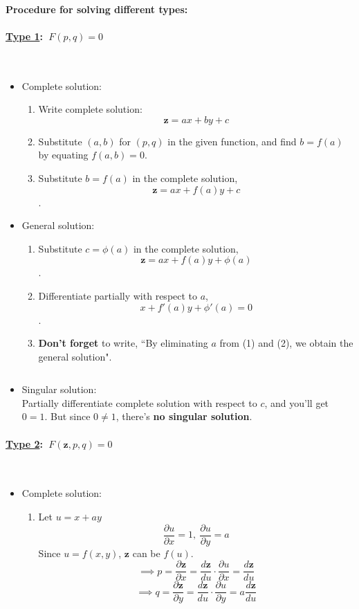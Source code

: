 \documentclass{article}
\newcommand{\para}[1]{\paragraph{#1}\mbox{}\\}
\begin{document}
{\paragraph{\LARGE Procedure for solving different types:}
\para{{\Large \underline{Type 1}: {\LARGE $\ F(p,q)=0$}}}
\begin{itemize}
\item Complete solution:
\begin{enumerate}[1)]
\item Write complete solution: {\LARGE $$\textbf{z}=ax+by+c$$}
\item Substitute $(a,b)$ for $(p,q)$ in the given function, and find {\LARGE $b=f(a)$} by equating {\LARGE $f(a,b)=0$}.
\item Substitute {\LARGE $b=f(a)$} in the complete solution,{\LARGE $$\textbf{z}=ax+f(a)y+c$$}.
\end{enumerate}
\item General solution:
\begin{enumerate}[1)]
\item Substitute {\LARGE $c=\phi(a)$} in the complete solution, {\LARGE $$\textbf{z}=ax+f(a)y+\phi(a)$$}.
\item Differentiate partially with respect to $a$, {\LARGE $$x+f'(a)y+\phi'(a)=0$$}.
\item \textbf{Don't forget} to write, ``By eliminating {\LARGE $a$} from (1) and (2), we obtain the general solution".
\end{enumerate}
$\ $
\item Singular solution: \\
Partially differentiate complete solution with respect to {\LARGE $c$}, and you'll get {\LARGE $0=1$}. But since {\LARGE $0\neq 1$}, there's \textbf{no singular solution}.
\end{itemize}
\para{{\Large \underline{Type 2}: {\LARGE $\ F(\textbf{z},p,q)=0$}}}
\begin{itemize}
\item Complete solution:
\begin{enumerate}[1)]
\item Let {\LARGE $u=x+ay$
$$\frac{\partial u}{\partial x}=1,\  \frac{\partial u}{\partial y}=a$$}
Since {\LARGE $u=f(x,y)$}, {\LARGE $\textbf{z}$} can be {\LARGE $f(u)$}.
{\LARGE $$\implies p=\frac{\partial \textbf{z}}{\partial x}=\frac{d \textbf{z}}{d u}\cdot\frac{\partial u}{\partial x}=\frac{d \textbf{z}}{d u}$$}
{\LARGE $$\implies q=\frac{\partial \textbf{z}}{\partial y}=\frac{d \textbf{z}}{d u}\cdot\frac{\partial u}{\partial y}=a\frac{d \textbf{z}}{d u}$$}

\end{enumerate}
\end{itemize}}
\end{document}
